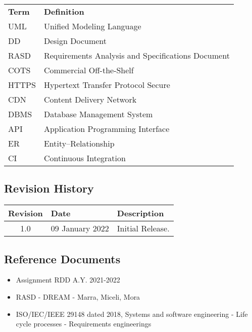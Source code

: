 \begin{center}
\renewcommand{\arraystretch}{1.25}
\begin{tabular}{l >{\raggedright\arraybackslash}p{12cm} } \hline
    \textbf{Term} & \textbf{Definition}\\ 
    UML & Unified Modeling Language\\
    DD & Design Document\\
    RASD & Requirements Analysis and Specifications Document\\
    	COTS & Commercial Off-the-Shelf\\
    	HTTPS & Hypertext Transfer Protocol Secure\\
    	CDN & Content Delivery Network\\
    	DBMS & Database Management System\\
    	API & Application Programming Interface\\
    	ER & Entity–Relationship\\
    	CI & Continuous Integration\\
    \hline
\end{tabular}
\end{center}



\subsection{Revision History}
\begin{flushleft}
\renewcommand{\arraystretch}{1.25}
\begin{tabular}{|c| l|>{\raggedright\arraybackslash}p{12cm} |} \hline
    \textbf{Revision} & \textbf{Date} & \textbf{Description}\\ \hline 
    1.0 & 09 January 2022 & Initial Release.\\
    \hline
\end{tabular}
\end{flushleft}

\subsection{Reference Documents}
\begin{itemize}
\item Assignment RDD A.Y. 2021-2022
\item RASD - DREAM - Marra, Miceli, Mora
\item ISO/IEC/IEEE 29148 dated 2018, Systems and software engineering - Life cycle processes - Requirements engineerings
\end{itemize}

